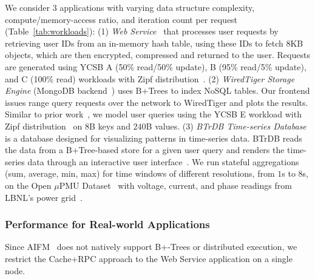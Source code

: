 We consider $3$ applications with varying data structure complexity, compute/memory-access ratio, and iteration count per request (Table~\ref{tab:workloads}): (1) \textit{Web Service}~\cite{aifm} that processes user requests by retrieving user IDs from an in-memory hash table, using these IDs to fetch 8KB objects, which are then encrypted, compressed and returned to the user. Requests are generated using YCSB A (50\% read/50\% update), B (95\% read/5\% update), and C (100\% read) workloads with Zipf distribution~\cite{ycsb_workload}. (2) \textit{WiredTiger Storage Engine} (MongoDB backend~\cite{mongodb}) uses B+Trees to index NoSQL tables. Our frontend issues range query requests over the network to WiredTiger and plots the results. Similar to prior work~\cite{aifm, xrp}, we model user queries using the YCSB E workload with Zipf distribution~\cite{ycsb_workload} on $8$B keys and $240$B values. (3) \textit{BTrDB Time-series Database}~\cite{btrdb} is a database designed for visualizing patterns in time-series data. BTrDB reads the data from a B+Tree-based store for a given user query and renders the time-series data through an interactive user interface~\cite{mrplotter}. We run stateful aggregations (sum, average, min, max) for time windows of different resolutions, from $1$s to $8$s, on the Open $\mu$PMU Dataset~\cite{upmu} with voltage, current, and phase readings from LBNL’s power grid~\cite{btrdb}.




\subsubsection{Performance for Real-world Applications} 
\label{sssec:application-study}


Since AIFM~\cite{aifm} does not natively support B+-Trees or distributed execution, we restrict the Cache+RPC approach to the Web Service application on a single node.


